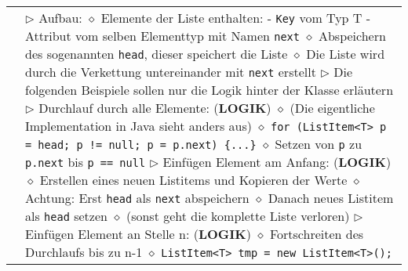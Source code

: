 \begin{longtable}{ | p{4cm} p{13.5cm} | }
	\makecell[l]{\texttt{LinkedList}} & \makecell[l]{$\rhd$ Aufbau: \\
	\hspace{0.4cm} $\diamond$ Elemente der Liste enthalten: \\
	\hspace{0.6cm} - \texttt{Key} vom Typ T \\
	\hspace{0.6cm} - Attribut vom selben Elementtyp mit Namen \texttt{next} \\
	\hspace{0.4cm} $\diamond$ Abspeichern des sogenannten \texttt{head}, dieser speichert die Liste \\
	\hspace{0.4cm} $\diamond$ Die Liste wird durch die Verkettung untereinander mit \texttt{next} erstellt \\
	$\rhd$ Die folgenden Beispiele sollen nur die Logik hinter der Klasse erläutern
	$\rhd$ Durchlauf durch alle Elemente: (\textbf{LOGIK})\\
	\hspace{0.4cm} $\diamond$ (Die eigentliche Implementation in Java sieht anders aus) \\
	\hspace{0.4cm} $\diamond$ \texttt{for (ListItem<T> p = head; p != null; p = p.next) \{...\}} \\
	\hspace{0.4cm} $\diamond$ Setzen von \texttt{p} zu \texttt{p.next} bis \texttt{p == null} \\
	$\rhd$ Einfügen Element am Anfang: (\textbf{LOGIK}) \\
	\hspace{0.4cm} $\diamond$ Erstellen eines neuen Listitems und Kopieren der Werte \\
	\hspace{0.4cm} $\diamond$ Achtung: Erst \texttt{head} als \texttt{next} abspeichern \\
	\hspace{0.4cm} $\diamond$ Danach neues Listitem als \texttt{head} setzen \\
	\hspace{0.4cm} $\diamond$ (sonst geht die komplette Liste verloren) \\
	$\rhd$ Einfügen Element an Stelle n: (\textbf{LOGIK}) \\
	\hspace{0.4cm} $\diamond$ Fortschreiten des Durchlaufs bis zu n-1 \\
	\hspace{0.4cm} $\diamond$ \texttt{ListItem<T> tmp = new ListItem<T>();} \\
}
\end{longtable}

